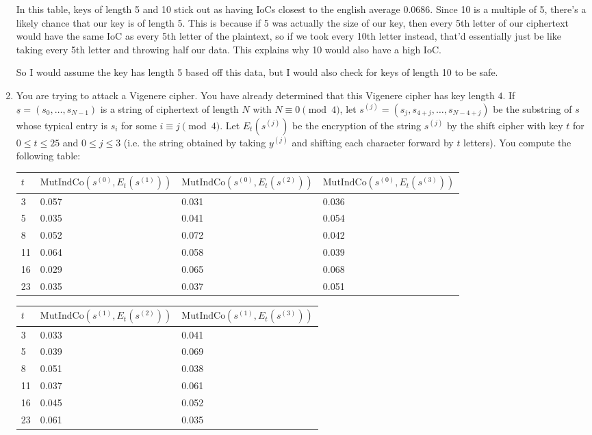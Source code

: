 \documentclass[12pt]{article}
\newcommand{\n}{\vspace{0.3cm}}
\begin{document}
\begin{enumerate}
In this table, keys of length 5 and 10 stick out as having IoCs closest to the english average 0.0686.  Since 10 is a multiple of 5, there's a likely chance that our key is of length 5.  This is because if 5 was actually the size of our key, then every 5th letter of our ciphertext would have the same IoC as every 5th letter of the plaintext, so if we took every 10th letter instead, that'd essentially just be like taking every 5th letter and throwing half our data. This explains why 10 would also have a high IoC. \n

So I would assume the key has length 5 based off this data, but I would also check for keys of length 10 to be safe.

\item   You are trying to attack a Vigenere cipher.  You have already determined that this Vigenere cipher has key length $4$.  If $\underline{s} = (s_0, \ldots, s_{N-1})$ is a string of ciphertext of length $N$ with $N \equiv 0 \pmod4$, let $s^{(j)} = (s_j,s_{4+j},\ldots,s_{N-4+j})$ be the substring of $s$ whose typical entry is $s_i$ for some $i \equiv j \pmod 4$.  Let $E_t(s^{(j)})$ be the encryption of the string $s^{(j)}$ by the shift cipher with key $t$ for $0 \leq t \leq 25$ and $0 \leq j \leq 3$ (i.e. the string obtained by taking $y^{(j)}$ and shifting each character forward by $t$ letters).  You compute the following table:

\begin{center}
    \begin{tabular}{ l | l | l | l }
    $t$ & $\mathrm{MutIndCo}(s^{(0)},E_t(s^{{(1)}}))$ & $\mathrm{MutIndCo}(s^{(0)},E_t(s^{{(2)}}))$  & $\mathrm{MutIndCo}(s^{(0)},E_t(s^{{(3)}}))$  \\ \hline
    3 & 0.057 & 0.031 & 0.036 \\     
    5 & 0.035 & 0.041 & 0.054 \\ 
    8& 0.052 & 0.072 & 0.042\\ 
    11 & 0.064 & 0.058 & 0.039\\ 
    16 & 0.029 & 0.065 & 0.068 \\ 
    23 & 0.035 & 0.037 & 0.051
    \end{tabular}
      \begin{tabular}{ l | l | l}
    $t$ & $\mathrm{MutIndCo}(s^{(1)},E_t(s^{{(2)}}))$ & $\mathrm{MutIndCo}(s^{(1)},E_t(s^{{(3)}}))$\\ \hline
    3 & 0.033 & 0.041 \\     
    5 & 0.039 & 0.069\\ 
    8 & 0.051 & 0.038\\ 
    11 & 0.037 & 0.061\\ 
    16 & 0.045 & 0.052\\ 
    23 & 0.061 & 0.035\\
    \end{tabular}
    \end{center} 
    

\end{enumerate}
\end{document}
